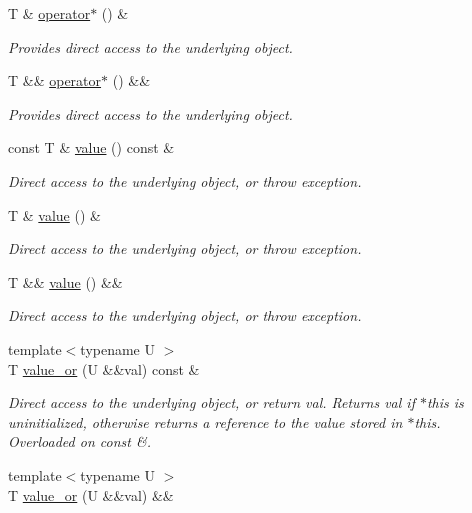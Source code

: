 \begin{DoxyCompactItemize}
T \& \hyperlink{classmcurses_1_1Optional_a2f816c249fc38f69c5c395fdf7d41ca8}{operator$\ast$} () \&
\begin{DoxyCompactList}\small\item\em Provides direct access to the underlying object. \end{DoxyCompactList}\item 
T \&\& \hyperlink{classmcurses_1_1Optional_aba889d24a53535305844ebcae23e6604}{operator$\ast$} () \&\&
\begin{DoxyCompactList}\small\item\em Provides direct access to the underlying object. \end{DoxyCompactList}\item 
const T \& \hyperlink{classmcurses_1_1Optional_ad366988d0311c9f6d4de369f222f248f}{value} () const \&
\begin{DoxyCompactList}\small\item\em Direct access to the underlying object, or throw exception. \end{DoxyCompactList}\item 
T \& \hyperlink{classmcurses_1_1Optional_ab94cd795bbc0dc263d61a2b49cd79084}{value} () \&
\begin{DoxyCompactList}\small\item\em Direct access to the underlying object, or throw exception. \end{DoxyCompactList}\item 
T \&\& \hyperlink{classmcurses_1_1Optional_a0d09d596f54af6693bedcf5dc12e6d3b}{value} () \&\&
\begin{DoxyCompactList}\small\item\em Direct access to the underlying object, or throw exception. \end{DoxyCompactList}\item 
{\footnotesize template$<$typename U $>$ }\\T \hyperlink{classmcurses_1_1Optional_a047c51eb457fd6de52987bf991935f01}{value\+\_\+or} (U \&\&val) const \&
\begin{DoxyCompactList}\small\item\em Direct access to the underlying object, or return {\ttfamily val}. Returns {\ttfamily val} if $\ast$this is uninitialized, otherwise returns a reference to the value stored in $\ast$this. Overloaded on const \&. \end{DoxyCompactList}\item 
{\footnotesize template$<$typename U $>$ }\\T \hyperlink{classmcurses_1_1Optional_aff211e864bc5bda6bc5b72298cdbadd3}{value\+\_\+or} (U \&\&val) \&\&

\end{DoxyCompactItemize}
